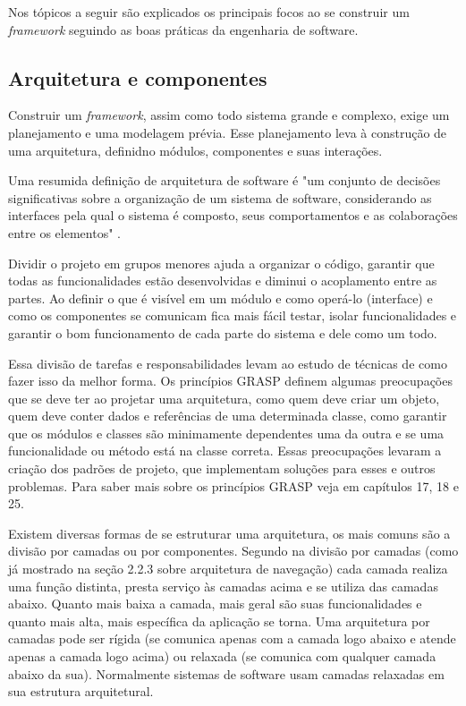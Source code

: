 Nos tópicos a seguir são explicados os principais focos ao se construir um \textit{framework} seguindo as boas práticas da engenharia de software.

\subsection{Arquitetura e componentes}

Construir um \textit{framework}, assim como todo sistema grande e complexo, exige um planejamento e uma modelagem prévia. Esse planejamento leva à construção de uma arquitetura, definidno módulos, componentes e suas interações.

Uma resumida definição de arquitetura de software é "um conjunto de decisões significativas sobre a organização de um sistema de software, considerando as interfaces pela qual o sistema é composto, seus comportamentos e as colaborações entre os elementos" \cite{Larman2005}.

Dividir o projeto em grupos menores ajuda a organizar o código, garantir que todas as funcionalidades estão desenvolvidas e diminui o acoplamento entre as partes. Ao definir o que é visível em um módulo e como operá-lo (interface) e como os componentes se comunicam fica mais fácil testar, isolar funcionalidades e garantir o bom funcionamento de cada parte do sistema e dele como um todo.

Essa divisão de tarefas e responsabilidades levam ao estudo de técnicas de como fazer isso da melhor forma. Os princípios GRASP definem algumas preocupações que se deve ter ao projetar uma arquitetura, como quem deve criar um objeto, quem deve conter dados e referências de uma determinada classe, como garantir que os módulos e classes são minimamente dependentes uma da outra e se uma funcionalidade ou método está na classe correta. Essas preocupações levaram a criação dos padrões de projeto, que implementam soluções para esses e outros problemas. Para saber mais sobre os princípios GRASP veja em \cite{Larman2005} capítulos 17, 18 e 25.

Existem diversas formas de se estruturar uma arquitetura, os mais comuns são a divisão por camadas ou por componentes. Segundo \cite{Larman2005} na divisão por camadas (como já mostrado na seção 2.2.3 sobre arquitetura de navegação) cada camada realiza uma função distinta, presta serviço às camadas acima e se utiliza das camadas abaixo. Quanto mais baixa a camada, mais geral são suas funcionalidades e quanto mais alta, mais específica da aplicação se torna. Uma arquitetura por camadas pode ser rígida (se comunica apenas com a camada logo abaixo e atende apenas a camada logo acima) ou relaxada (se comunica com qualquer camada abaixo da sua). Normalmente sistemas de software usam camadas relaxadas em sua estrutura arquitetural.

